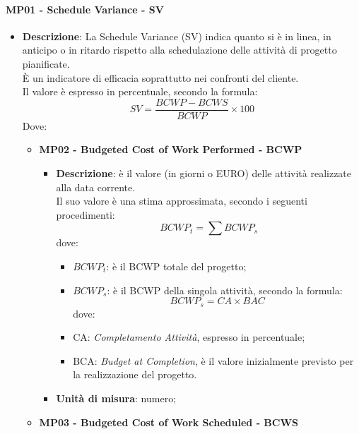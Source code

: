 	 	\paragraph{MP01 - Schedule Variance - SV}
	 	\begin{itemize}
	 		\item \textbf{Descrizione}:
	 			La Schedule Variance (SV) indica quanto si è in linea, in anticipo o in ritardo rispetto alla schedulazione delle attività di progetto pianificate. \\
	 			È un indicatore di efficacia soprattutto nei confronti del cliente.\\
	 			Il valore è espresso in percentuale, secondo la formula:
	 			\begin{displaymath}
	 				SV = \frac{BCWP-BCWS}{BCWP}\times100
	 			\end{displaymath}
	 			Dove:
	 			\begin{itemize}
	 				\item {\bfseries MP02 - Budgeted Cost of Work Performed - BCWP}
	 				\begin{itemize}
	 					\item \textbf{Descrizione}:
	 					è  il valore (in giorni o EURO) delle attività realizzate alla data corrente.\\
	 					Il suo valore è una stima approssimata, secondo i seguenti procedimenti:
	 					\begin{displaymath}
	 						BCWP_t = \sum BCWP_s
	 					\end{displaymath}
	 					dove:
	 					\begin{itemize}
	 						\item {\bfseries $BCWP_t$}: è il BCWP totale del progetto;
	 						\item {\bfseries $BCWP_s$}: è il BCWP della singola attività, secondo la formula:
	 						\begin{displaymath}
	 							BCWP_s = CA\times BAC
	 						\end{displaymath}
	 						dove:
	 						\item  CA: {\itshape Completamento Attività}, espresso in percentuale;
	 						\item BCA: {\itshape Budget at Completion}, è il valore inizialmente previsto per la realizzazione del progetto.
	 					\end{itemize}
	 					\item \textbf{Unità di misura}: numero;
	 				\end{itemize}
	 				\item {\bfseries MP03 - Budgeted Cost of Work Scheduled - BCWS}

\end{itemize}
\end{itemize}
